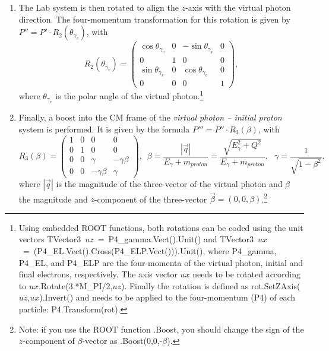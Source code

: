 \begin{enumerate}
\item The Lab system is then rotated to align the $z$-axis with the virtual photon direction. The four-momentum transformation for this rotation is given by $P'' = P' \cdot R_2 (\theta_{\gamma_{v}})$, with 
\begin{equation}
R_{2}(\theta_{\gamma_{v}})=\begin{pmatrix}
\cos\theta_{\gamma_{v}} &0  &-\sin\theta_{\gamma_{v}}  &0 \\ 
 0& 1 & 0 &0 \\ 
 \sin\theta_{\gamma_{v}} &0  &\cos\theta_{\gamma_{v}}  & 0\\ 
0 &0  & 0 &1 
\end{pmatrix},
\end{equation}
where $\theta_{\gamma_v}$ is the polar angle of the virtual photon.\footnote[2]{Using embedded ROOT functions, both rotations can be coded using the unit vectors TVector3~$uz$~=~P4\_gamma.Vect().Unit() and 
 TVector3~$ux$~=~(P4\_EL.Vect().Cross(P4\_ELP.Vect())).Unit(), where P4\_gamma, P4\_EL, and P4\_ELP are the four-momenta of the virtual photon, initial and final electrons, respectively. 
 The axis vector $ux$ needs to be rotated according to $ux$.Rotate(3.*M\_PI/2,$uz$).
Finally the rotation is defined as rot.SetZAxis($uz$,$ux$).Invert() and needs to be applied to the four-momentum (P4) of each particle:
 P4.Transform(rot).}

\item Finally, a boost into the CM frame of the {\em virtual photon -- initial proton} system is performed. It is given by the formula $P''' = P'' \cdot R_3(\beta)$, with 
\begin{equation}
R_{3}(\beta) = \begin{pmatrix}
1 &0  &0  &0 \\ 
0 &1  &0  &0 \\ 
 0&  0& \gamma  &-\gamma \beta  \\ 
 0&  0& -\gamma \beta  & \gamma 
\end{pmatrix}, \, \, \, \beta =\frac{|\overrightarrow{q}|}{E_{\gamma }+m_{proton}}=\frac{\sqrt{E^{2}_{\gamma }+Q^{2}}}{E_{\gamma }+m_{proton}}, \, \, \,\,  \gamma =\frac{1}{\sqrt{1-\beta ^{2}}},
\end{equation}
where $|\overrightarrow{q}|$ is the magnitude of the three-vector of the virtual photon and $\beta$ the magnitude and $z$-component of the three-vector $\overrightarrow{\beta}=(0,0,\beta)$.\footnote[3]{
Note: if you use the ROOT function .Boost, you should change the sign of the $z$-component of $\beta$-vector as .Boost(0,0,-$\beta$).}
\end{enumerate}


